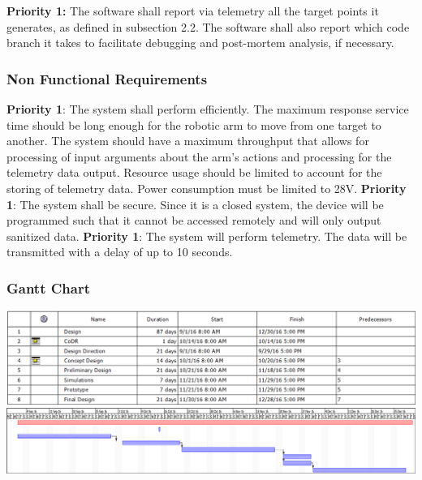 \textbf{Priority 1:}
The software shall report via telemetry all the target points it generates, as defined in subsection 2.2.
The software shall also report which code branch it takes to facilitate debugging and post-mortem analysis, if necessary. 

\subsubsection{Non Functional Requirements}
\textbf{Priority 1}: The system shall perform efficiently. The maximum response service time should be long enough for the robotic arm to move from one target to another.
 The system should have a maximum throughput that allows for processing of input arguments about the arm's actions and processing for the telemetry data output. 
 Resource usage should be limited to account for the storing of telemetry data. Power consumption must be limited to 28V.
\textbf{Priority 1}: The system shall be secure. Since it is a closed system, the device will be programmed such that it cannot be accessed remotely and will only output sanitized data.
\textbf{Priority 1}: The system will perform telemetry. The data will be transmitted with a delay of up to 10 seconds.

\subsubsection{Gantt Chart}
\includegraphics[width=\textwidth]{./images/gantttable}
\includegraphics[width=\textwidth]{./images/ganttchart}

